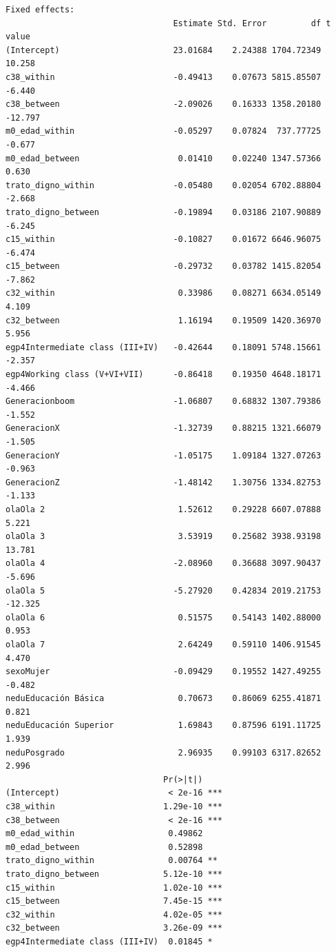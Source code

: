 \documentclass[
  spanish,
  a4paper,
  oneside]{scrbook}
\begin{document}
\begin{verbatim}
Fixed effects:
                                  Estimate Std. Error         df t value
(Intercept)                       23.01684    2.24388 1704.72349  10.258
c38_within                        -0.49413    0.07673 5815.85507  -6.440
c38_between                       -2.09026    0.16333 1358.20180 -12.797
m0_edad_within                    -0.05297    0.07824  737.77725  -0.677
m0_edad_between                    0.01410    0.02240 1347.57366   0.630
trato_digno_within                -0.05480    0.02054 6702.88804  -2.668
trato_digno_between               -0.19894    0.03186 2107.90889  -6.245
c15_within                        -0.10827    0.01672 6646.96075  -6.474
c15_between                       -0.29732    0.03782 1415.82054  -7.862
c32_within                         0.33986    0.08271 6634.05149   4.109
c32_between                        1.16194    0.19509 1420.36970   5.956
egp4Intermediate class (III+IV)   -0.42644    0.18091 5748.15661  -2.357
egp4Working class (V+VI+VII)      -0.86418    0.19350 4648.18171  -4.466
Generacionboom                    -1.06807    0.68832 1307.79386  -1.552
GeneracionX                       -1.32739    0.88215 1321.66079  -1.505
GeneracionY                       -1.05175    1.09184 1327.07263  -0.963
GeneracionZ                       -1.48142    1.30756 1334.82753  -1.133
olaOla 2                           1.52612    0.29228 6607.07888   5.221
olaOla 3                           3.53919    0.25682 3938.93198  13.781
olaOla 4                          -2.08960    0.36688 3097.90437  -5.696
olaOla 5                          -5.27920    0.42834 2019.21753 -12.325
olaOla 6                           0.51575    0.54143 1402.88000   0.953
olaOla 7                           2.64249    0.59110 1406.91545   4.470
sexoMujer                         -0.09429    0.19552 1427.49255  -0.482
neduEducación Básica               0.70673    0.86069 6255.41871   0.821
neduEducación Superior             1.69843    0.87596 6191.11725   1.939
neduPosgrado                       2.96935    0.99103 6317.82652   2.996
                                Pr(>|t|)    
(Intercept)                      < 2e-16 ***
c38_within                      1.29e-10 ***
c38_between                      < 2e-16 ***
m0_edad_within                   0.49862    
m0_edad_between                  0.52898    
trato_digno_within               0.00764 ** 
trato_digno_between             5.12e-10 ***
c15_within                      1.02e-10 ***
c15_between                     7.45e-15 ***
c32_within                      4.02e-05 ***
c32_between                     3.26e-09 ***
egp4Intermediate class (III+IV)  0.01845 *  

\end{verbatim}
\end{document}
